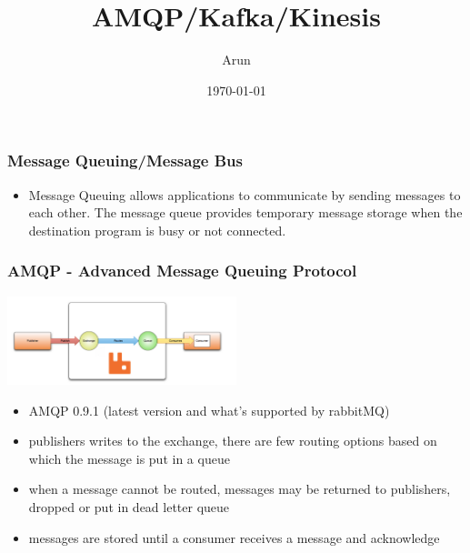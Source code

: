 \documentclass[12pt]{beamer}
\title{AMQP/Kafka/Kinesis}
\author{Arun}
\date{\today}
\begin{document}
        \begin{frame}
            \begin{center}
                \frametitle{Message Queuing/Message Bus}
                \begin{itemize}
                    \pause
                    \item Message Queuing allows applications to communicate by sending messages to each other. The message queue provides temporary message storage when the destination program is busy or not connected.
                \end{itemize}
            \end{center}
        \end{frame}
        
        \begin{frame}
            \begin{center}
                \frametitle{AMQP - Advanced Message Queuing Protocol}
                \includegraphics[width=0.5\textwidth]{images/simple-amqp}
                \begin{itemize}
                    \item AMQP 0.9.1 (latest version and what's supported by rabbitMQ)
                    \pause
                    \item publishers writes to the exchange, there are few routing options based on which the message is put in a queue
                    \pause
                    \item when a message cannot be routed, messages may be returned to publishers, dropped or put in dead letter queue
                    \pause
                    \item messages are stored until a consumer receives a message and acknowledge
                \end{itemize}
            \end{center}
        \end{frame}
\end{document}
